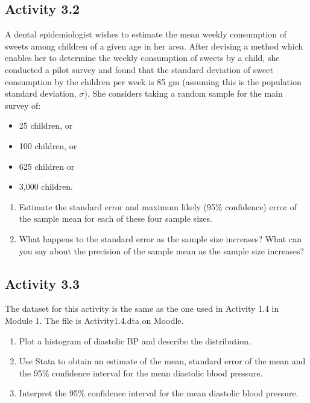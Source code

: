 \documentclass[
]{memoir}
\providecommand{\tightlist}{%
  \setlength{\itemsep}{0pt}\setlength{\parskip}{0pt}}
\begin{document}
\hypertarget{activity-3.2}{%
\subsection*{Activity 3.2}\label{activity-3.2}}

A dental epidemiologist wishes to estimate the mean weekly consumption of sweets among children of a given age in her area. After devising a method which enables her to determine the weekly consumption of sweets by a child, she conducted a pilot survey and found that the standard deviation of sweet consumption by the children per week is 85 gm (assuming this is the population standard deviation, \(\sigma\)). She considers taking a random sample for the main survey of:

\begin{itemize}
\tightlist
\item
  25 children, or
\item
  100 children, or
\item
  625 children or
\item
  3,000 children.
\end{itemize}

\begin{enumerate}
\def\labelenumi{\alph{enumi})}
\tightlist
\item
  Estimate the standard error and maximum likely (95\% confidence) error of the sample mean for each of these four sample sizes.
\item
  What happens to the standard error as the sample size increases? What can you say about the precision of the sample mean as the sample size increases?
\end{enumerate}

\hypertarget{activity-3.3}{%
\subsection*{Activity 3.3}\label{activity-3.3}}

The dataset for this activity is the same as the one used in Activity 1.4 in Module 1. The file is Activity1.4.dta on Moodle.

\begin{enumerate}
\def\labelenumi{\alph{enumi})}
\tightlist
\item
  Plot a histogram of diastolic BP and describe the distribution.
\item
  Use Stata to obtain an estimate of the mean, standard error of the mean and the 95\% confidence interval for the mean diastolic blood pressure.
\item
  Interpret the 95\% confidence interval for the mean diastolic blood pressure.
\end{enumerate}
\end{document}
